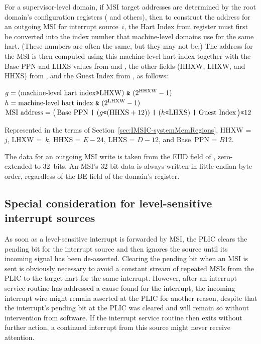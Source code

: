 For a supervisor-level domain, if MSI target addresses are determined
by the root domain's configuration registers ( and others),
then to construct the address for an outgoing MSI for interrupt
source~$i$, the Hart Index from register  must first be
converted into the index number that machine-level domains use for
the same hart.
(These numbers are often the same, but they may not be.)
The address for the MSI is then computed using this machine-level hart
index together with the Base PPN and LHXS values
from  and ,
the other fields (HHXW, LHXW, and HHXS) from ,
and the Guest Index from , as follows:
\begin{displayLinesTable}
$g =
  (\mbox{machine-level hart index\z{>>}LHXW})
    \mbox{ \z{\&} }(\mbox{2}^{\rm HHXW}-\mbox{1})$\\
$h = \mbox{machine-level hart index \z{\&} }(\mbox{2}^{\rm LHXW}-\mbox{1})$\\
$\mbox{MSI address} =
  \bigl(\,
    \mbox{Base PPN \z{|} }(g\mbox{\z{<<}}(\mbox{HHXS}+\mbox{12}))
      \mbox{ \z{|} }(h\mbox{\z{<<}LHXS})\mbox{ \z{|} Guest Index}
  \,\bigr)\mbox{\z{<<}12}$
\end{displayLinesTable}

Represented in the terms of Section~\ref{sec:IMSIC-systemMemRegions},
HHXW =~$j$, LHXW =~$k$, HHXS = ${E-24}$, LHXS = ${D-12}$, and
Base~PPN = $B$\z{>>}12.

The data for an outgoing MSI write is taken from the EIID field of
, zero-extended to 32~bits.
An MSI's \mbox{32-bit} data is always written in little-endian byte
order, regardless of the BE field of the domain's 
register.

\subsection{Special consideration for level-sensitive interrupt sources}

As soon as a level-sensitive interrupt is forwarded by MSI, the PLIC
clears the pending bit for the interrupt source and then ignores the
source until its incoming signal has been de-asserted.
Clearing the pending bit when an MSI is sent is obviously necessary to
avoid a constant stream of repeated MSIs from the PLIC to the target
hart for the same interrupt.
However, after an interrupt service routine has addressed a cause found
for the interrupt, the incoming interrupt wire might remain asserted at
the PLIC for another reason, despite that the interrupt's pending bit
at the PLIC was cleared and will remain so without intervention from
software.
If the interrupt service routine then exits without further action,
a continued interrupt from this source might never receive attention.

